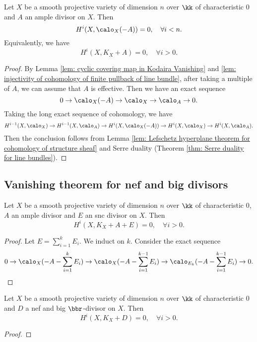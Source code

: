     \begin{theorem}\label{thm: Kodaira Vanishing Theorem}
        Let \(X\) be a smooth projective variety of dimension \(n\) over \(\kk\) of characteristic \(0\) and \(A\) an ample divisor on \(X\). 
        Then
        \[
            H^i(X, \calo_X(-A)) = 0,\quad \forall i < n.
        \]
        Equivalently, we have
        \[
            H^i(X, K_X + A) = 0,\quad \forall i > 0.
        \]
    \end{theorem}
    \begin{proof}
        By Lemma \ref{lem: cyclic covering map in Kodaira Vanishing} and \ref{lem: injectivity of cohomology of finite pullback of line bundle}, after taking a multiple of \(A\), we can assume that \(A\) is effective.
        Then we have an exact sequence
        \[ 0 \to \calo_X(-A) \to \calo_X \to \calo_A \to 0. \]
        Taking the long exact sequence of cohomology, we have
        \[ H^{i-1}(X,\calo_X) \to H^{i-1}(X, \calo_A) \to H^{i}(X, \calo_X(-A)) \to H^{i}(X, \calo_X) \to H^{i}(X, \calo_A). \]
        Then the conclusion follows from Lemma \ref{lem: Lefschetz hyperplane theorem for cohomology of structure sheaf} and Serre duality (Theorem \ref{thm: Serre duality for line bundles}).
    \end{proof}

\subsection{Vanishing theorem for nef and big divisors}

    \begin{lemma}\label{lem: vanishing for ample plus snc divisor}
        Let \(X\) be a smooth projective variety of dimension \(n\) over \(\kk\) of characteristic \(0\), \(A\) an ample divisor and \(E\) an snc divisor on \(X\).
        Then
        \[
            H^i(X, K_X + A + E) = 0,\quad \forall i > 0.
        \]
    \end{lemma}
    \begin{proof}
        Let \(E = \sum_{i=1}^k E_i\).
        We induct on \(k\).
        Consider the exact sequence
        \[ 0 \to \calo_X(-A-\sum_{i=1}^{k} E_i) \to \calo_X(-A-\sum_{i=1}^{k-1} E_i) \to \calo_{E_k}(-A-\sum_{i=1}^{k-1} E_i) \to 0. \]
    \end{proof}

    \begin{theorem}\label{thm: Kawamata-Viehweg Vanishing Theorem for nef and big divisor}
        Let \(X\) be a smooth projective variety of dimension \(n\) over \(\kk\) of characteristic \(0\) and \(D\) a nef and big \(\bbr\)-divisor on \(X\).
        Then 
        \[ H^i(X, K_X + D) = 0,\quad \forall i > 0. \]
    \end{theorem}
    \begin{proof}
    \end{proof}

